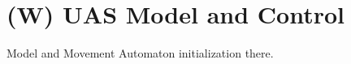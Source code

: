 \section{(W) UAS Model and Control}\label{s:modelMAImplementation}
    \noindent Model and Movement Automaton initialization there.